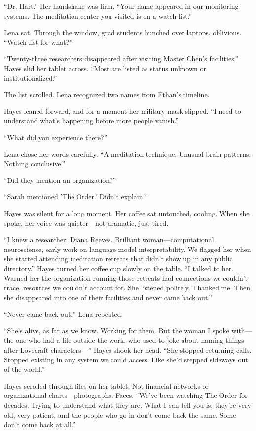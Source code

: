 ``Dr. Hart.'' Her handshake was firm. ``Your name appeared in our monitoring systems. The meditation center you visited is on a watch list.''

Lena sat. Through the window, grad students hunched over laptops, oblivious. ``Watch list for what?''

``Twenty-three researchers disappeared after visiting Master Chen's facilities.'' Hayes slid her tablet across. ``Most are listed as status unknown or institutionalized.''

The list scrolled. Lena recognized two names from Ethan's timeline.

Hayes leaned forward, and for a moment her military mask slipped. ``I need to understand what's happening before more people vanish.''

``What did you experience there?''

Lena chose her words carefully. ``A meditation technique. Unusual brain patterns. Nothing conclusive.''

``Did they mention an organization?''

``Sarah mentioned 'The Order.' Didn't explain.''

Hayes was silent for a long moment. Her coffee sat untouched, cooling. When she spoke, her voice was quieter---not dramatic, just tired.

``I knew a researcher. Diana Reeves. Brilliant woman---computational neuroscience, early work on language model interpretability. We flagged her when she started attending meditation retreats that didn't show up in any public directory.'' Hayes turned her coffee cup slowly on the table. ``I talked to her. Warned her the organization running those retreats had connections we couldn't trace, resources we couldn't account for. She listened politely. Thanked me. Then she disappeared into one of their facilities and never came back out.''

``Never came back out,'' Lena repeated.

``She's alive, as far as we know. Working for them. But the woman I spoke with---the one who had a life outside the work, who used to joke about naming things after Lovecraft characters---'' Hayes shook her head. ``She stopped returning calls. Stopped existing in any system we could access. Like she'd stepped sideways out of the world.''

Hayes scrolled through files on her tablet. Not financial networks or organizational charts---photographs. Faces. ``We've been watching The Order for decades. Trying to understand what they are. What I can tell you is: they're very old, very patient, and the people who go in don't come back the same. Some don't come back at all.''

